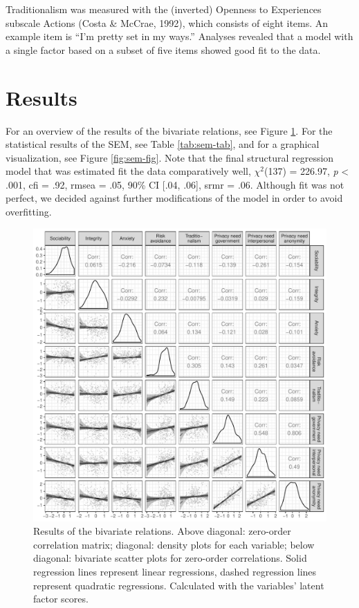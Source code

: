 \documentclass[man,floatsintext]{apa6}
\begin{document}
Traditionalism was measured with the (inverted) Openness to Experiences subscale Actions (Costa \& McCrae, 1992), which consists of eight items. An example item is \enquote{I'm pretty set in my ways.} Analyses revealed that a model with a single factor based on a subset of five items showed good fit to the data.

\hypertarget{results}{%
\section{Results}\label{results}}

For an overview of the results of the bivariate relations, see Figure \ref{fig:bivar-fig}. For the statistical results of the SEM, see Table \ref{tab:sem-tab}, and for a graphical visualization, see Figure \ref{fig:sem-fig}. Note that the final structural regression model that was estimated fit the data comparatively well, \(\chi^2\)(137) = 226.97, \textit{p} \textless{} .001, cfi = .92, rmsea = .05, 90\% CI {[}.04, .06{]}, srmr = .06. Although fit was not perfect, we decided against further modifications of the model in order to avoid overfitting.

\begin{figure}[!ht]

{\centering \includegraphics[width=.9\textwidth]{manuscript_files/figure-latex/bivar-fig-1} 

}

\caption{Results of the bivariate relations. Above diagonal: zero-order correlation matrix; diagonal: density plots for each variable; below diagonal: bivariate scatter plots for zero-order correlations. Solid regression lines represent linear regressions, dashed regression lines represent quadratic regressions. Calculated with the variables’ latent factor scores.}\label{fig:bivar-fig}
\end{figure}
\end{document}
